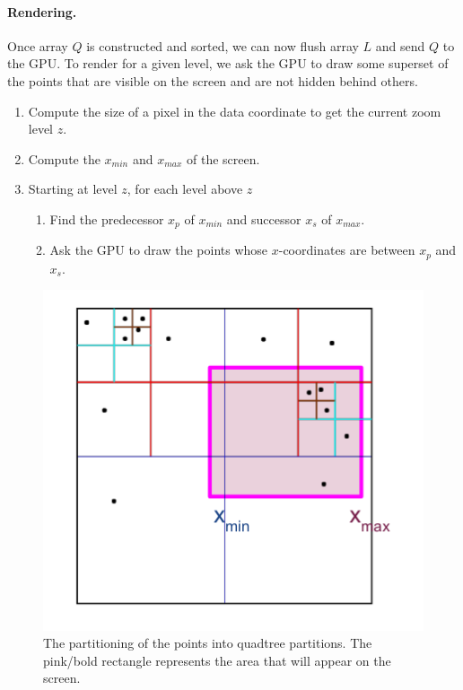 \documentclass[11pt,a4paper]{article}
\begin{document}
\paragraph{Rendering. } 
Once array $Q$ is constructed and sorted, we can now flush array $L$ and send $Q$ to the GPU.
To render for a given level, we ask the GPU to draw some superset of the points that are visible on the
screen and are not hidden behind others.

\begin{enumerate}
\item Compute the size of a pixel in the data coordinate to get the current zoom level $z$.
\item Compute the $x_{min}$ and $x_{max}$ of the screen.
\item Starting at level $z$, for each level above $z$
	\begin{enumerate}
		\item Find the predecessor $x_p$ of $x_{min}$ and successor $x_s$ of $x_{max}$.
		\item Ask the GPU to draw the points whose $x$-coordinates are between $x_p$ and $x_s$.
	\end{enumerate}
\end{enumerate}



\begin{figure}[hbt]
  \begin{center}
    \includegraphics[scale=0.6]{quadtree-screen.png}
    \caption{The partitioning of the points into quadtree partitions. The pink/bold rectangle represents the area that will appear on the screen.}
    \label{quad}
  \end{center}
\end{figure}
\end{document}
